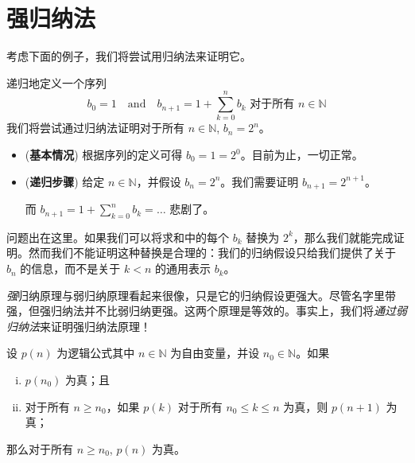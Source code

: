 \section{强归纳法}

考虑下面的例子，我们将尝试用归纳法来证明它。

\begin{example}
\label{exProofByWeakInductionFail}
递归地定义一个序列
\[ b_0 = 1 \quad \text{and} \quad b_{n+1} = 1 + \sum_{k=0}^n b_k \text{ 对于所有 } n \in \mathbb{N} \]
我们将尝试通过归纳法证明对于所有 $n \in \mathbb{N}$, $b_n = 2^n$。

\begin{itemize}
\item (\textbf{基本情况}) 根据序列的定义可得 $b_0=1=2^0$。目前为止，一切正常。

\item (\textbf{递归步骤}) 给定 $n \in \mathbb{N}$，并假设 $b_n = 2^n$。我们需要证明 $b_{n+1}=2^{n+1}$。

而 $b_{n+1} = 1 + \sum_{k=0}^n b_k = {\dots}$ 悲剧了。
\end{itemize}

问题出在这里。如果我们可以将求和中的每个 $b_k$ 替换为 $2^k$，那么我们就能完成证明。然而我们不能证明这种替换是合理的：我们的归纳假设只给我们提供了关于 $b_n$ 的信息，而不是关于 $k < n$ 的通用表示 $b_k$。
\end{example}

\textit{强}归纳原理与弱归纳原理看起来很像，只是它的归纳假设更强大。尽管名字里带强，但强归纳法并不比弱归纳更强。这两个原理是等效的。事实上，我们将\textit{通过弱归纳法}来证明强归纳法原理！

\begin{theorem}[强归纳法原理]
\label{thmStrongInduction}
设 $p(n)$ 为逻辑公式其中 $n \in \mathbb{N}$ 为自由变量，并设  $n_0 \in \mathbb{N}$。如果
\begin{enumerate}[(i)]
\item $p(n_0)$ 为真；且
\item 对于所有 $n \ge n_0$，如果 $p(k)$ 对于所有 $n_0 \le k \le n$ 为真，则 $p(n+1)$ 为真；
\end{enumerate}
那么对于所有 $n \ge n_0$, $p(n)$ 为真。
\end{theorem}

